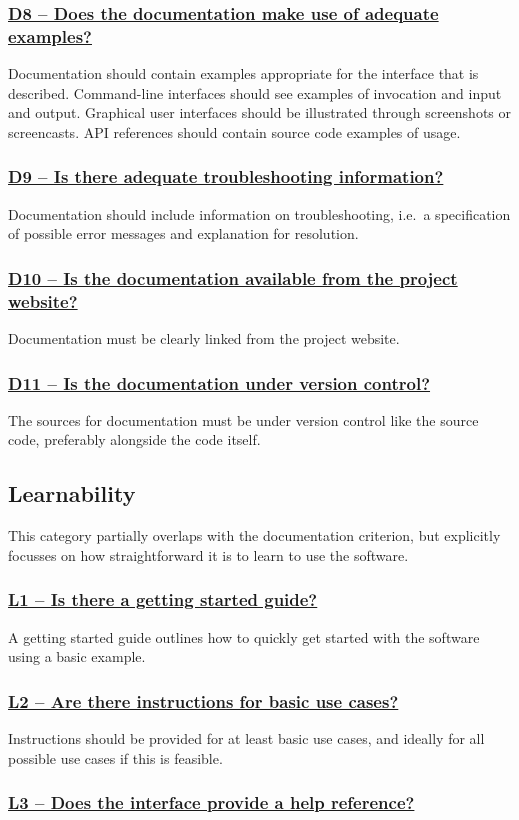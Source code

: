 \documentclass[a4paper,11pt]{article}
\newcommand{\indicator}[1]{\subsubsection*{\underline{#1}}}
\begin{document}
\indicator{D8 -- Does the documentation make use of adequate examples?}

Documentation should contain examples appropriate for the interface that is
described. Command-line interfaces should see examples of invocation and input
and output. Graphical user interfaces should be illustrated through screenshots or
screencasts. API references should contain source code examples of usage.

\indicator{D9 -- Is there adequate troubleshooting information?}

Documentation should include information on troubleshooting, i.e.\ a
specification of possible error messages and explanation for resolution.

\indicator{D10 -- Is the documentation available from the project website?}

Documentation must be clearly linked from the project website.

\indicator{D11 -- Is the documentation under version control?}

The sources for documentation must be under version control like the source
code, preferably alongside the code itself.

\subsection{Learnability}

This category partially overlaps with the documentation criterion, but explicitly
focusses on how straightforward it is to learn to use the software.

\indicator{L1 -- Is there a getting started guide?}

A getting started guide outlines how to quickly get started with the software
using a basic example.

\indicator{L2 -- Are there instructions for basic use cases?}

Instructions should be provided for at least basic use cases, and ideally for
all possible use cases if this is feasible.

%
%
%


\indicator{L3 -- Does the interface provide a help reference?}
\end{document}
